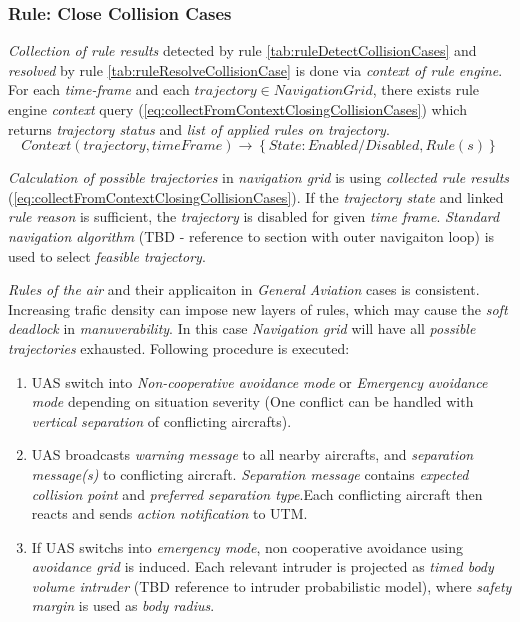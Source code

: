 \subsubsection{Rule: Close Collision Cases}    
    \noindent\emph{Collection of rule results} detected by rule \ref{tab:ruleDetectCollisionCases} and \emph{resolved} by rule \ref{tab:ruleResolveCollisionCase} is done via \emph{context of rule engine}. For each \emph{time-frame} and each $trajectory\in NavigationGrid$, there exists rule engine \emph{context} query (\ref{eq:collectFromContextClosingCollisionCases}) which returns \emph{trajectory status} and \emph{list of applied rules on trajectory}.
    \begin{equation}\label{eq:collectFromContextClosingCollisionCases}
        Context(trajectory,timeFrame) \to \left\{State: Enabled/Disabled, Rule(s)\right\}
    \end{equation}
    
    \emph{Calculation of possible trajectories} in \emph{navigation grid} is using \emph{collected rule results} (\ref{eq:collectFromContextClosingCollisionCases}). If the \emph{trajectory state} and linked \emph{rule reason} is sufficient, the \emph{trajectory} is disabled for given \emph{time frame}. \emph{Standard navigation algorithm} (TBD - reference to section with outer navigaiton loop) is used to select \emph{feasible trajectory}. 
    
    \emph{Rules of the air} and their applicaiton in \emph{General Aviation} cases is consistent. Increasing trafic density can impose new layers of rules, which may cause the \emph{soft deadlock} in \emph{manuverability}. In this case \emph{Navigation grid} will have all  \emph{possible trajectories} exhausted. Following procedure is executed:
    \begin{enumerate}
        \item UAS switch into \emph{Non-cooperative avoidance mode} or \emph{Emergency avoidance mode} depending on situation severity (One conflict can be handled with \emph{vertical separation} of conflicting aircrafts).
        \item UAS broadcasts \emph{warning message} to all nearby aircrafts, and \emph{separation message(s)} to conflicting aircraft. \emph{Separation message} contains \emph{expected collision point} and \emph{preferred separation type}.Each conflicting aircraft then reacts and sends \emph{action notification} to UTM.
        \item If UAS switchs into \emph{emergency mode}, non cooperative avoidance using \emph{avoidance grid} is induced. Each relevant intruder is projected as \emph{timed body volume intruder} (TBD reference to intruder probabilistic model), where \emph{safety margin} is used as \emph{body radius}.
    \end{enumerate}
    
